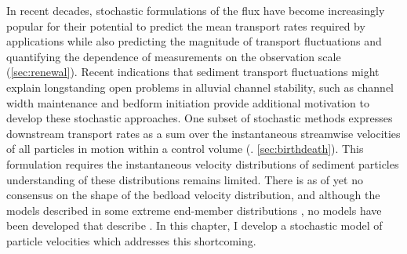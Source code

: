 \DIFaddend In recent decades, stochastic formulations of the \DIFdelbegin {}\DIFdelend \DIFaddbegin {}\DIFaddend flux have become increasingly popular for their potential to predict the mean transport rates required by applications while also predicting the magnitude of transport fluctuations and quantifying the dependence of measurements on the observation scale (\DIFdelbegin {}\DIFdelend \DIFaddbegin {}\DIFaddend \ref{sec:renewal}).
Recent indications that sediment transport fluctuations might explain longstanding open problems in alluvial channel stability, such as channel width maintenance \citep{Abramian2019,Abramian2020} and bedform initiation \citep{Jerolmack2005,Bohorquez2016} provide additional motivation to develop these stochastic approaches.
One subset of stochastic methods expresses downstream transport rates as a sum over the instantaneous streamwise velocities of all particles in motion within a control volume (\DIFdelbegin {}\DIFdelend \DIFaddbegin {}\DIFaddend . \ref{sec:birthdeath}).
This formulation requires the instantaneous velocity distributions of sediment particles \DIFdelbegin {}\DIFdelend \DIFaddbegin {}\DIFaddend understanding of these distributions remains limited.
There is as of yet no consensus on the shape of the bedload velocity distribution, and although the models described in \DIFdelbegin {}\DIFdelend \DIFaddbegin {}\DIFaddend some extreme end-member distributions \citep[e.g.][]{Fan2014,Ancey2014}, no models have been developed that describe \DIFdelbegin {}\DIFdelend \DIFaddbegin {}\DIFaddend \citep{Lajeunesse2010,Fathel2015,Heyman2016,Liu2019,Houssais2012}.
In this chapter, I develop a stochastic model of particle velocities which addresses this shortcoming.

